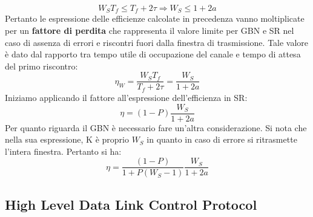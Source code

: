 \documentclass[12pt]{article}
\begin{document}
\begin{equation*}
    W_ST_f \leq T_f + 2\tau \Rightarrow W_S \leq 1 + 2a
\end{equation*}
Pertanto le espressione delle efficienze calcolate in precedenza vanno moltiplicate per un \textbf{fattore di perdita} che rappresenta il valore limite per GBN e SR nel caso di assenza di errori e riscontri fuori dalla finestra di trasmissione. Tale valore è dato dal rapporto tra tempo utile di occupazione del canale e tempo di attesa del primo riscontro:
\begin{equation*}
    \eta_W = \frac{W_ST_f}{T_f + 2\tau} = \frac{W_S}{1 + 2a}
\end{equation*}
Iniziamo applicando il fattore all'espressione dell'efficienza in SR:
\begin{equation*}
    \eta = (1 - P)\frac{W_S}{1 + 2a}
\end{equation*}
Per quanto riguarda il GBN è necessario fare un'altra considerazione. Si nota che nella sua espressione, K è proprio $W_S$ in quanto in caso di errore si ritrasmette l'intera finestra. Pertanto si ha:
\begin{equation*}
    \eta = \frac{(1 - P)}{1 + P(W_S - 1)}\frac{W_S}{1 + 2a}
\end{equation*}

\subsection{High Level Data Link Control Protocol}
\end{document}
